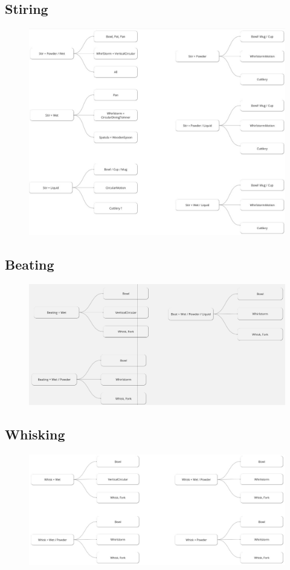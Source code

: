 \subsection*{Stiring}
\begin{figure}[H]
\includegraphics[scale=0.4]{Graphics/StirringDT.jpg}
\end{figure}


\subsection*{Beating}
\begin{figure}[H]
\includegraphics[scale=0.3]{Graphics/BeatingDT.jpg}
\end{figure}

\subsection*{Whisking}
\begin{figure}[H]
\includegraphics[scale=0.3]{Graphics/WhiskingDT.jpg}
\end{figure}